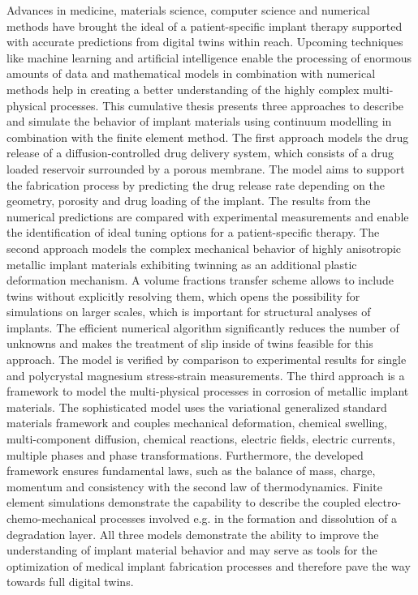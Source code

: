 Advances in medicine, materials science, computer science and numerical methods have brought the ideal of a patient-specific implant therapy supported with accurate predictions from digital twins within reach. Upcoming techniques like machine learning and artificial intelligence enable the processing of enormous amounts of data and mathematical models in combination with numerical methods help in creating a better understanding of the highly complex multi-physical processes. This cumulative thesis presents three approaches to describe and simulate the behavior of implant materials using continuum modelling in combination with the finite element method. The first approach models the drug release of a diffusion-controlled drug delivery system, which consists of a drug loaded reservoir surrounded by a porous membrane. The model aims to support the fabrication process by predicting the drug release rate depending on the geometry, porosity and drug loading of the implant. The results from the numerical predictions are compared with experimental measurements and enable the identification of ideal tuning options for a patient-specific therapy. The second approach models the complex mechanical behavior of highly anisotropic metallic implant materials exhibiting twinning as an additional plastic deformation mechanism. A volume fractions transfer scheme allows to include twins without explicitly resolving them, which opens the possibility for simulations on larger scales, which is important for structural analyses of implants. The efficient numerical algorithm significantly reduces the number of unknowns and makes the treatment of slip inside of twins feasible for this approach. The model is verified by comparison to experimental results for single and polycrystal magnesium stress-strain measurements. The third approach is a framework to model the multi-physical processes in corrosion of metallic implant materials. The sophisticated model uses the variational generalized standard materials framework and couples mechanical deformation, chemical swelling, multi-component diffusion, chemical reactions, electric fields, electric currents, multiple phases and phase transformations. Furthermore, the developed framework ensures fundamental laws, such as the balance of mass, charge, momentum and consistency with the second law of thermodynamics. Finite element simulations demonstrate the capability to describe the coupled electro-chemo-mechanical processes involved e.g. in the formation and dissolution of a degradation layer. All three models demonstrate the ability to improve the understanding of implant material behavior and may serve as tools for the optimization of medical implant fabrication processes and therefore pave the way towards full digital twins. 